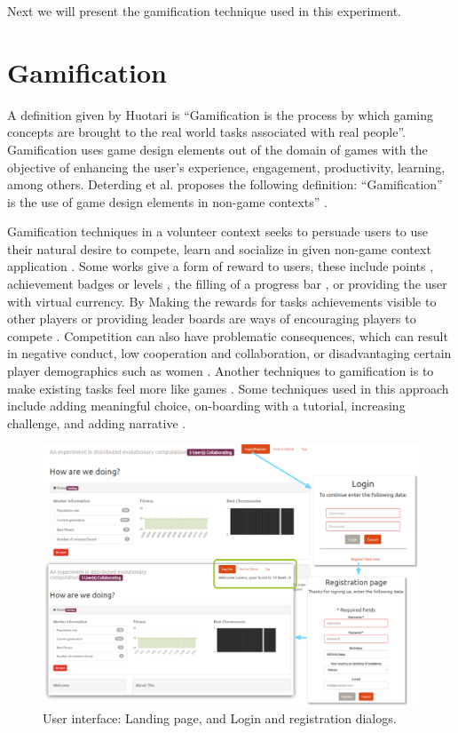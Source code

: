 \documentclass{llncs}
\begin{document}
Next we will present the gamification technique used in this experiment. 

\section{Gamification}
\label{sec:gamification}
A definition given by Huotari  \cite{huotari2012defining} is ``Gamification is
the process by which gaming concepts are brought to the real world tasks associated with
real people''. Gamification uses game design elements out of the domain of games 
with the objective of enhancing the user's experience, engagement, productivity, 
learning, among others. Deterding et al. proposes the following definition:
 ``Gamification” is the use of game design elements in non-game contexts'' 
 \cite{deterding2011gamification}.

Gamification techniques in a volunteer context seeks to persuade 
users to use their natural desire to compete, learn and socialize in 
given non-game context application \cite{deterding2011game,hamari2014does}.  
Some works give a form of reward to users, these include 
points \cite{sutter2010browse}, achievement badges or levels \cite{hamari2011framework}, 
the filling of a progress bar \cite{o2010get}, or providing the user with virtual currency.
By Making the rewards for  tasks achievements visible to other players or 
providing leader boards are ways of encouraging players to compete \cite{hickman2010total}. 
Competition can also have problematic consequences, which can result in
negative conduct, low cooperation and collaboration, or disadvantaging certain player demographics
such as women \cite{kumar2013gamification}. Another techniques to gamification 
is to make existing tasks feel more like games \cite{deterding2010just}. 
Some techniques used in this approach include adding meaningful choice, 
on-boarding with a tutorial, increasing challenge, and adding narrative \cite{mcgonigal2011reality}.

\begin{figure}[htbp]
    \centering
        \includegraphics[width=5in]{img/login.png}
    \caption{ User interface: Landing page, and Login and registration dialogs.  
    }
    \label{fig:login}
\end{figure}
\end{document}
